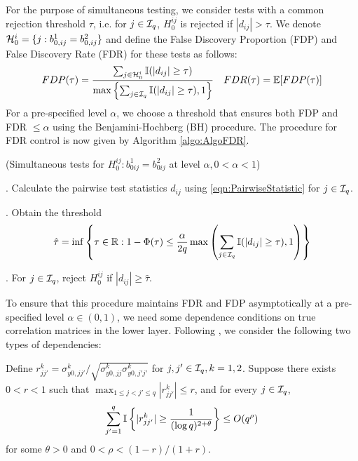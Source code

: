 For the purpose of simultaneous testing, we consider tests with a common rejection threshold $\tau$, i.e. for $j \in {\cal{I}}_q$, $H_0^{ij}$ is rejected if $| d_{ij} | > \tau$. We denote ${\cal{H}}_0^i = \{ j: b_{0,ij}^1 = b_{0,ij}^2 \}$ and define the False Discovery Proportion (FDP) and False Discovery Rate (FDR) for these tests as follows:
%
$$
FDP (\tau) = \frac{\sum_{j \in {\cal{H}}_0^i} {\mathbb{I}}( |d_{ij}| \geq \tau)}{\max\left\{
\sum_{j \in {\cal{I}}_q} {\mathbb{I}}( |d_{ij}| \geq \tau), 1\right\} }\quad
FDR (\tau) = {\mathbb{E}} [ FDP (\tau) ]
$$
%
For a pre-specified level $\alpha$, we choose a threshold that ensures both FDP and FDR $\leq \alpha$ using the Benjamini-Hochberg (BH) procedure. %
The procedure for FDR control is now given by Algorithm \ref{algo:AlgoFDR}.

\begin{Algorithm}\label{algo:AlgoFDR}
(Simultaneous tests for $H_0^{ij}: b_{0 ij}^1 = b_{0 ij}^2$ at level $\alpha, 0< \alpha< 1$)

. Calculate the pairwise test statistics $d_{ij}$ using \eqref{eqn:PairwiseStatistic} for $j \in {\cal{I}}_q$.

. Obtain the threshold
%
$$
\hat \tau = \inf \left\{\tau \in {\mathbb{R}}: 1 - \Phi(\tau) \leq \frac{\alpha}{2 q}
\max \left( \sum_{j \in {\cal{I}}_q} {\mathbb{I}}( |d_{ij}| \geq \tau), 1 \right) \right\}
$$
%

. For $j \in {\cal{I}}_q$, reject $H_0^{ij}$ if $|d_{ij}| \geq \hat \tau$.
\end{Algorithm}

To ensure that this procedure maintains FDR and FDP asymptotically at a pre-specified level $\alpha \in (0,1)$, we need some dependence conditions on true correlation matrices in the lower layer. Following \cite{LiuShao14}, we consider the following two types of dependencies:

 Define $r_{jj'}^k = \sigma_{y0,jj'}^k /\sqrt{\sigma_{y0,jj}^k \sigma_{y0,j'j'}^k}$ for $j,j' \in {\cal{I}}_q, k = 1,2$. Suppose there exists $0 < r < 1$ such that $\max_{1 \leq j < j' \leq q} | r_{jj'}^k | \leq r$, and for every $j \in {\cal{I}}_q$,
%
$$
\sum_{j'=1}^q {\mathbb{I}} \left\{ |r_{jj'}^k| \geq \frac{1}{(\log q)^{2 + \theta}} \right\} \leq O(q^\rho)
$$
%
for some $\theta > 0$ and $0 < \rho < (1-r)/(1+r)$.

